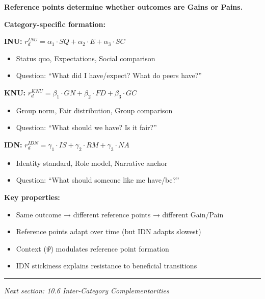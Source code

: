 \begin{tcolorbox}[colback=gray!5!white, colframe=gray!75!black, title=Section 10.5 Summary]
\textbf{Reference points determine whether outcomes are Gains or Pains.}

\textbf{Category-specific formation:}

\textbf{INU:} $r^{INU}_d = \alpha_1 \cdot SQ + \alpha_2 \cdot E + \alpha_3 \cdot SC$
\begin{itemize}
\item Status quo, Expectations, Social comparison
\item Question: ``What did I have/expect? What do peers have?''
\end{itemize}

\textbf{KNU:} $r^{KNU}_d = \beta_1 \cdot GN + \beta_2 \cdot FD + \beta_3 \cdot GC$
\begin{itemize}
\item Group norm, Fair distribution, Group comparison
\item Question: ``What should we have? Is it fair?''
\end{itemize}

\textbf{IDN:} $r^{IDN}_d = \gamma_1 \cdot IS + \gamma_2 \cdot RM + \gamma_3 \cdot NA$
\begin{itemize}
\item Identity standard, Role model, Narrative anchor
\item Question: ``What should someone like me have/be?''
\end{itemize}

\textbf{Key properties:}
\begin{itemize}
\item Same outcome → different reference points → different Gain/Pain
\item Reference points adapt over time (but IDN adapts slowest)
\item Context ($\Psi$) modulates reference point formation
\item IDN stickiness explains resistance to beneficial transitions
\end{itemize}
\end{tcolorbox}

\vspace{1em}
\hrule
\vspace{0.5em}
\noindent\textit{Next section: 10.6 Inter-Category Complementarities}

